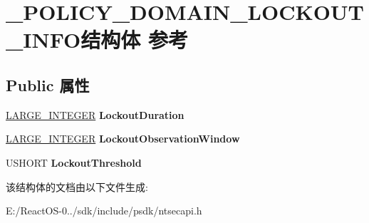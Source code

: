 \hypertarget{struct___p_o_l_i_c_y___d_o_m_a_i_n___l_o_c_k_o_u_t___i_n_f_o}{}\section{\+\_\+\+P\+O\+L\+I\+C\+Y\+\_\+\+D\+O\+M\+A\+I\+N\+\_\+\+L\+O\+C\+K\+O\+U\+T\+\_\+\+I\+N\+F\+O结构体 参考}
\label{struct___p_o_l_i_c_y___d_o_m_a_i_n___l_o_c_k_o_u_t___i_n_f_o}
\subsection*{Public 属性}
\begin{DoxyCompactItemize}
\item 
\mbox{\label{struct___p_o_l_i_c_y___d_o_m_a_i_n___l_o_c_k_o_u_t___i_n_f_o_a7656e064c1cde164c330d2d0ea736783}} 
\hyperlink{union___l_a_r_g_e___i_n_t_e_g_e_r}{L\+A\+R\+G\+E\+\_\+\+I\+N\+T\+E\+G\+ER} {\bfseries Lockout\+Duration}
\item 
\mbox{\label{struct___p_o_l_i_c_y___d_o_m_a_i_n___l_o_c_k_o_u_t___i_n_f_o_aa041d0e5ed1532c302919b67e54e4f01}} 
\hyperlink{union___l_a_r_g_e___i_n_t_e_g_e_r}{L\+A\+R\+G\+E\+\_\+\+I\+N\+T\+E\+G\+ER} {\bfseries Lockout\+Observation\+Window}
\item 
\mbox{\label{struct___p_o_l_i_c_y___d_o_m_a_i_n___l_o_c_k_o_u_t___i_n_f_o_a72750c42acfa8e78e967ee33ab823046}} 
U\+S\+H\+O\+RT {\bfseries Lockout\+Threshold}
\end{DoxyCompactItemize}


该结构体的文档由以下文件生成\+:\begin{DoxyCompactItemize}
\item 
E\+:/\+React\+O\+S-\/0../sdk/include/psdk/ntsecapi.\+h\end{DoxyCompactItemize}
